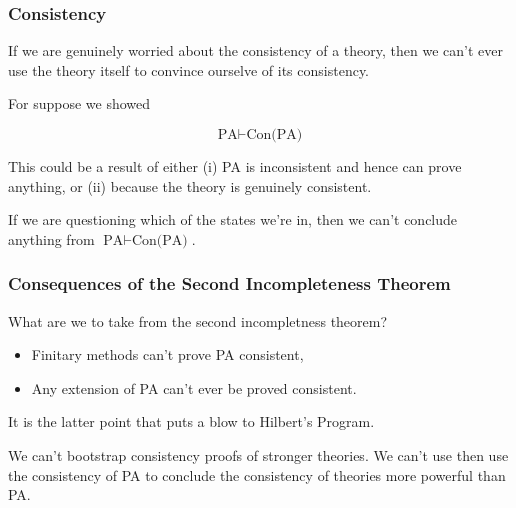 \documentclass{beamer}
\begin{document}
\begin{frame}
	\frametitle{Consistency}
	
	If we are genuinely worried about the consistency of a theory, then we can't ever use the theory itself to convince ourselve of its consistency. 
	
	\vspace{0.5cm}
	
	For suppose we showed 
	
	$$ \text{PA} \vdash \text{Con(PA)}$$
	
	This could be a result of either (i) PA is inconsistent and hence can prove anything, or (ii) because the theory is genuinely consistent. 
	
	\vspace{0.5cm}
	
	If we are questioning which of the states we're in, then we can't conclude anything from $ \text{PA} \vdash \text{Con(PA)}$.
	
\end{frame}

\begin{frame}
	\frametitle{Consequences of the Second Incompleteness Theorem}
	
	What are we to take from the second incompletness theorem? 
	
	\vspace{0.5cm}

	\begin{itemize}
		\item Finitary methods can't prove PA consistent,
		\item Any extension of PA can't ever be proved consistent.
	\end{itemize}
	
	\vspace{0.3cm}
	
	It is the latter point that puts a blow to Hilbert's Program. 
	
	We can't bootstrap consistency proofs of stronger theories. We can't use then use the consistency of PA to conclude the consistency of theories more powerful than PA.
	
	
	
	
\end{frame}
\end{document}

